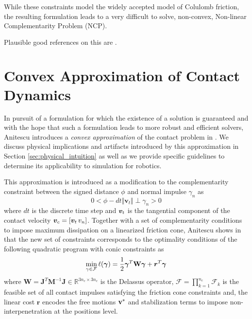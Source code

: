 While these constraints model the widely accepted model of Colulomb friction,
the resulting formulation leads to a very difficult to solve, non-convex,
Non-linear Complementarity Problem (NCP). 



Plausible good references on this are
\cite{bib:stewart1996implicit,bib:stewart2000implicit,bib:chakraborty2007implicit,bib:acary2018solving,bib:pang1999unified,bib:alart2018inconsistency}.

\section{Convex Approximation of Contact Dynamics}
\label{sec:previous_work}

In pursuit of a formulation for which the existence of a solution is guaranteed
and with the hope that such a formulation leads to more robust and efficient
solvers, Anitescu introduces a \textit{convex approximation} of the contact
problem in \cite{bib:anitescu2006}. We discuss physical implications and
artifacts introduced by this approximation in Section
\ref{sec:physical_intuition} as well as we provide specific guidelines to
determine its applicability to simulation for robotics.

This approximation is introduced as a
modification to the complementarity constraint between the signed distance
$\phi$ and normal impulse
$\gamma_n$ as
\begin{equation}
	0 < \phi - dt \Vert {\bm v}_t \Vert \perp \gamma_n > 0
	\label{eq:convex_approximation_complementarity_condition}
\end{equation}
where $dt$ is the discrete time step and ${\bm{v}}_t$ is the tangential component
of the contact velocity ${\bm{v}}_c = [{\bm{v}}_t\,v_n]$. Together with a set of
complementarity conditions to impose maximum dissipation on a linearized
friction cone, Anitescu shows in \cite{bib:anitescu2006} that the new set of
constraints corresponds to the optimality conditions of the following quadratic
program with conic constraints as
\begin{eqnarray}
	\min_{\gamma\in \mathcal{F}} \ell(\bgamma) =
	\frac{1}{2}\bgamma^T\mathbf{W}\bgamma + {\bm r}^T
	\bgamma
	\label{eq:dual_cost}
\end{eqnarray}
where $\mathbf{W} =
\mathbf{J}^T\mathbf{M}^{-1}\mathbf{J}\in\mathbb{R}^{3n_c\times 3n_c}$ is the
Delassus operator, $\mathcal{F}=\prod_{k=1}^{n_c}\mathcal{F}_k$ is the feasible
set of all contact impulses satisfying the friction cone constraints and, the
linear cost ${\bm r}$ encodes the free motions ${\mathbf{v}}^*$ and stabilization
terms to impose non-interpenetration at the positions level.

